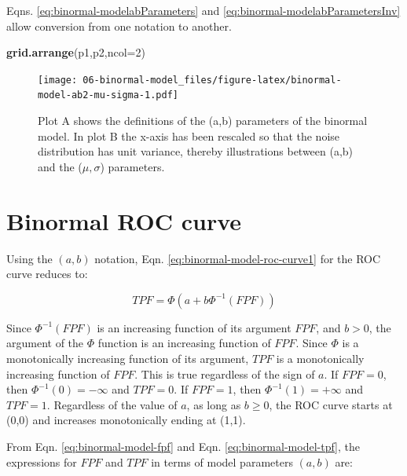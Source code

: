 \documentclass[
]{book}
\newenvironment{Shaded}{\begin{snugshade}}{\end{snugshade}}
\newcommand{\DataTypeTok}[1]{\textcolor[rgb]{0.13,0.29,0.53}{#1}}
\newcommand{\DecValTok}[1]{\textcolor[rgb]{0.00,0.00,0.81}{#1}}
\newcommand{\KeywordTok}[1]{\textcolor[rgb]{0.13,0.29,0.53}{\textbf{#1}}}
\newcommand{\NormalTok}[1]{#1}
\begin{document}
Eqns. \eqref{eq:binormal-modelabParameters} and \eqref{eq:binormal-modelabParametersInv} allow conversion from one notation to another.

\begin{Shaded}
\begin{Highlighting}[]
\KeywordTok{grid.arrange}\NormalTok{(p1,p2,}\DataTypeTok{ncol=}\DecValTok{2}\NormalTok{)}
\end{Highlighting}
\end{Shaded}

\begin{figure}
\centering
\texttt{[image: 06-binormal-model\_files/figure-latex/binormal-model-ab2-mu-sigma-1.pdf]}
\caption{\label{fig:binormal-model-ab2-mu-sigma}Plot A shows the definitions of the (a,b) parameters of the binormal model. In plot B the x-axis has been rescaled so that the noise distribution has unit variance, thereby illustrations between (a,b) and the (\(\mu,\sigma\)) parameters.}
\end{figure}

\hypertarget{binormal-model-roc-curve}{%
\section{Binormal ROC curve}\label{binormal-model-roc-curve}}

Using the \((a,b)\) notation, Eqn. \eqref{eq:binormal-model-roc-curve1} for the ROC curve reduces to:

\begin{equation} 
TPF = \Phi\left ( a+ b \Phi^{-1}\left (FPF  \right ) \right )
\label{eq:binormal-model-roc-curve}
\end{equation}

Since \(\Phi^{-1}(FPF)\) is an increasing function of its argument \(FPF\), and \(b > 0\), the argument of the \(\Phi\) function is an increasing function of \(FPF\). Since \(\Phi\) is a monotonically increasing function of its argument, \(TPF\) is a monotonically increasing function of \(FPF\). This is true regardless of the sign of \(a\). If \(FPF = 0\), then \(\Phi^{-1}(0) = -\infty\) and \(TPF = 0\). If \(FPF = 1\), then \(\Phi^{-1}(1) = +\infty\) and \(TPF = 1\). Regardless of the value of \(a\), as long as \(b \ge 0\), the ROC curve starts at (0,0) and increases monotonically ending at (1,1).

From Eqn. \eqref{eq:binormal-model-fpf} and Eqn. \eqref{eq:binormal-model-tpf}, the expressions for \(FPF\) and \(TPF\) in terms of model parameters \((a,b)\) are:
\end{document}
